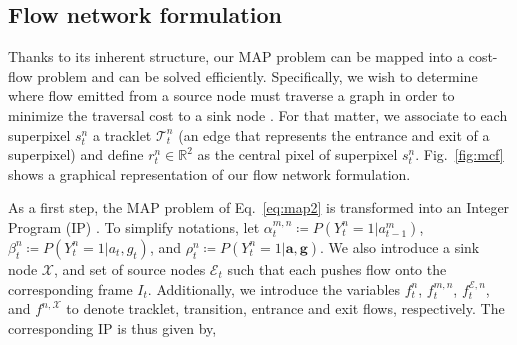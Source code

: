 \subsection{Flow network formulation}
\label{sec:solving}
Thanks to its inherent structure, our MAP problem can be mapped into a cost-flow problem and can be solved efficiently. Specifically, we wish to determine where flow emitted from a source node must traverse a graph in order to minimize the traversal cost to a sink node \cite{zhang08}. For that matter, we associate to each superpixel $s_t^n$ a tracklet $\mathcal{T}_t^n$ (\ie an edge that represents the entrance and exit of a superpixel) and define $r_t^n\in \mathbb{R}^2$ as the central pixel of superpixel $s_t^n$. Fig.~\ref{fig:mcf} shows a graphical representation of our flow network formulation.

As a first step, the MAP problem of Eq.~\eqref{eq:map2} is transformed into an Integer Program (IP) \cite{schrijver98}. To simplify notations, let $\alpha_t^{m,n} \coloneqq P(Y_t^n=1|a_{t-1}^m)$, $\beta_t^n \coloneqq P(Y_t^n=1|a_t,g_t)$, and $\rho_t^n \coloneqq P(Y_t^n=1|\bm{a},\bm{g})$. We also introduce a sink node $\mathcal{X}$, and set of source nodes $\mathcal{E}_t$ such that each pushes flow onto the corresponding frame $I_t$.
Additionally, we introduce the variables $f_t^n$, $f_t^{m,n}$, $f_t^{\mathcal{E},n}$, and $f^{n,\mathcal{X}}$ to denote tracklet, transition, entrance and exit flows, respectively. The corresponding IP is thus given by,

